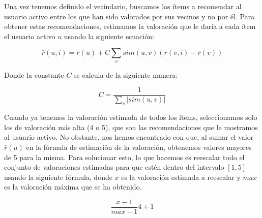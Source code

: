 Una vez tenemos definido el vecindario, buscamos los ítems a recomendar al usuario activo entre los que han sido valorados por sus vecinos y no por él. Para obtener estas recomendaciones, estimamos la valoración que le daría a cada ítem el usuario activo $u$ usando la siguiente ecuación:

\begin{equation}
    \hat{r}(u,i) = \bar{r}(u) + C\sum_v sim(u,v)(r(v,i) - \bar{r}(v))
\end{equation}

Donde la constante $C$ se calcula de la siguiente manera:

\begin{equation}
    C = \frac{1}{\sum_v |sim(u,v)|}
\end{equation}

Cuando ya tenemos la valoración estimada de todos los ítems, seleccionamos solo los de valoración más alta (4 o 5), que son las recomendaciones que le mostramos al usuario activo. No obstante, nos hemos encontrado con que, al sumar el valor $\bar{r}(u)$ en la fórmula de estimación de la valoración, obtenemos valores mayores de 5 para la misma. Para solucionar esto, lo que hacemos es reescalar todo el conjunto de valoraciones estimadas para que estén dentro del intervalo $[1, 5]$ usando la siguiente fórmula, donde $x$ es la valoración estimada a reescalar y $max$ es la valoración máxima que se ha obtenido.

\begin{equation}
    \frac{x-1}{max-1}4+1
\end{equation}